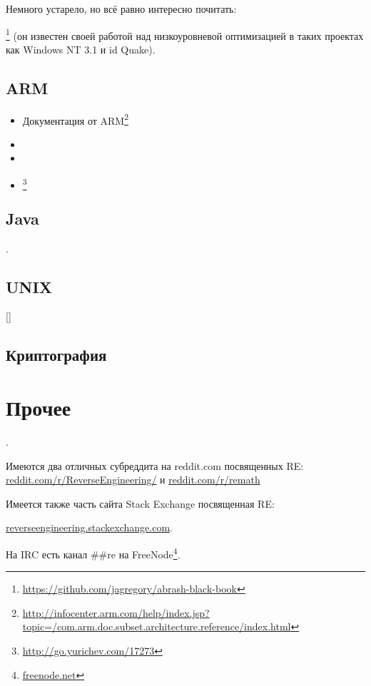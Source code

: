 Немного устарело, но всё равно интересно почитать:

\MAbrash\footnote{\AlsoAvailableAs \url{https://github.com/jagregory/abrash-black-book}}
(он известен своей работой над низкоуровневой оптимизацией в таких проектах как Windows NT 3.1 и id Quake).

\section{ARM}

\begin{itemize}
\item Документация от ARM\footnote{\AlsoAvailableAs \url{http://infocenter.arm.com/help/index.jsp?topic=/com.arm.doc.subset.architecture.reference/index.html}}

\item \ARMSevenRef

\item \ARMSixFourRefURL

\item \ARMCookBook\footnote{\AlsoAvailableAs \url{http://go.yurichev.com/17273}}
\end{itemize}

\section{Java}

\JavaBook.

\section{UNIX}

[\TAOUP]

\section{Криптография}



\chapter{Прочее}

\HenryWarren.

Имеются два отличных субреддита на reddit.com посвященных \ac{RE}:
\href{http://go.yurichev.com/17027}{reddit.com/r/ReverseEngineering/} и
\href{http://go.yurichev.com/17028}{reddit.com/r/remath}

Имеется также часть сайта Stack Exchange посвященная \ac{RE}:

\par \href{http://go.yurichev.com/17029}{reverseengineering.stackexchange.com}.

На IRC есть канал \#\#re на
FreeNode\footnote{\href{http://go.yurichev.com/17030}{freenode.net}}.

